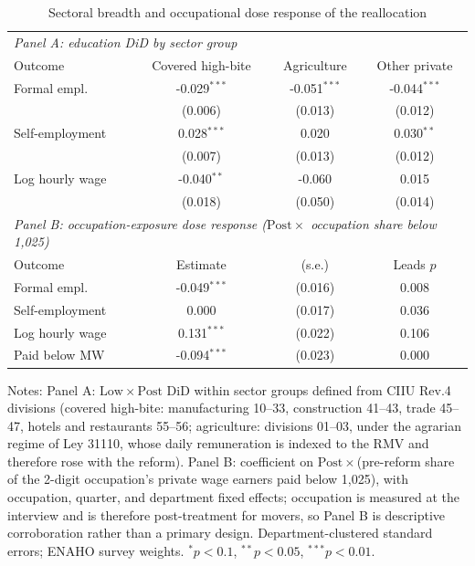 \begin{table}[!tbp]\centering
\caption{Sectoral breadth and occupational dose response of the reallocation}\label{tab:sectorocc}
\begin{threeparttable}
\footnotesize
\begin{tabular}{lccc}
\toprule
\multicolumn{4}{l}{\emph{Panel A: education DiD by sector group}}\\
Outcome & Covered high-bite & Agriculture & Other private \\
\midrule
Formal empl. & -0.029$^{***}$ & -0.051$^{***}$ & -0.044$^{***}$ \\
 & (0.006) & (0.013) & (0.012) \\
Self-employment & 0.028$^{***}$ & 0.020 & 0.030$^{**}$ \\
 & (0.007) & (0.013) & (0.012) \\
Log hourly wage & -0.040$^{**}$ & -0.060 & 0.015 \\
 & (0.018) & (0.050) & (0.014) \\
\midrule
\multicolumn{4}{l}{\emph{Panel B: occupation-exposure dose response ($\mathrm{Post}\times$ occupation share below 1{,}025)}}\\
Outcome & Estimate & (s.e.) & Leads $p$ \\ \midrule
Formal empl. & -0.049$^{***}$ & (0.016) & 0.008 \\
Self-employment & 0.000 & (0.017) & 0.036 \\
Log hourly wage & 0.131$^{***}$ & (0.022) & 0.106 \\
Paid below MW & -0.094$^{***}$ & (0.023) & 0.000 \\
\bottomrule
\end{tabular}
\begin{tablenotes}\footnotesize
\item Notes: Panel A: $\mathrm{Low}\times\mathrm{Post}$ DiD within sector groups defined from CIIU Rev.4 divisions (covered high-bite: manufacturing 10--33, construction 41--43, trade 45--47, hotels and restaurants 55--56; agriculture: divisions 01--03, under the agrarian regime of Ley 31110, whose daily remuneration is indexed to the RMV and therefore rose with the reform). Panel B: coefficient on $\mathrm{Post}\times$(pre-reform share of the 2-digit occupation's private wage earners paid below 1{,}025), with occupation, quarter, and department fixed effects; occupation is measured at the interview and is therefore post-treatment for movers, so Panel B is descriptive corroboration rather than a primary design. Department-clustered standard errors; ENAHO survey weights. $^{*}p<0.1$, $^{**}p<0.05$, $^{***}p<0.01$.
\end{tablenotes}
\end{threeparttable}\end{table}
